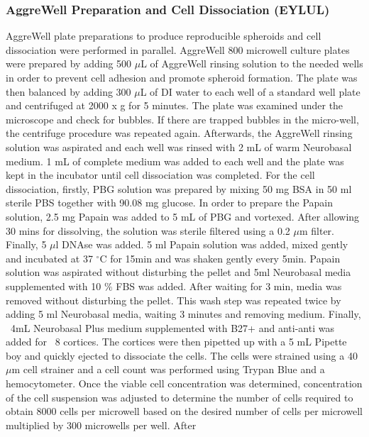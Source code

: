 \subsubsection{AggreWell\textsuperscript{\texttrademark} Preparation and Cell Dissociation (EYLUL)}
AggreWell\textsuperscript{\texttrademark} plate preparations to produce
reproducible spheroids and cell dissociation were performed in parallel.
AggreWell\textsuperscript{\texttrademark} 800 microwell culture plates were
prepared by adding 500 $\mu$L of AggreWell\textsuperscript{\texttrademark}
rinsing solution to the needed wells in order to prevent cell adhesion and
promote spheroid formation. The plate was then balanced by adding 300 $\mu$L of
DI water to each well of a standard well plate and centrifuged at 2000 x g for 5
minutes. The plate was examined under the microscope and check for bubbles. If
there are trapped bubbles in the micro-well, the centrifuge procedure was
repeated again. Afterwards, the AggreWell\textsuperscript{\texttrademark}
rinsing solution was aspirated and each well was rinsed with 2 mL of warm
Neurobasal medium. 1 mL of complete medium was added to each well and the plate
was kept in the incubator until cell dissociation was completed. For the cell
dissociation, firstly, PBG solution was prepared by mixing 50 mg BSA in 50 ml
sterile PBS together with 90.08 mg glucose. In order to prepare the Papain
solution, 2.5 mg Papain was added to 5 mL of PBG and vortexed. After allowing 30
mins for dissolving, the solution was sterile filtered using a 0.2 $\mu$m
filter. Finally, 5 $\mu$l DNAse was added. 5 ml Papain solution was added, mixed
gently and incubated at 37 $^{\circ}$C for 15min and was shaken gently every
5min. Papain solution was aspirated without disturbing the pellet and 5ml
Neurobasal media supplemented with 10 $\%$ FBS was added. After waiting for 3
min, media was removed without disturbing the pellet. This wash step was
repeated twice by adding 5 ml Neurobasal media, waiting 3 minutes and removing
medium. Finally, ~4mL Neurobasal Plus medium supplemented with B27+ and
anti-anti was added for ~8 cortices. The cortices were then pipetted up with a 5
mL Pipette boy and quickly ejected to dissociate the cells. The cells were
strained using a 40 $\mu$m cell strainer and a cell count was performed using
Trypan Blue and a hemocytometer. Once the viable cell concentration was
determined, concentration of the cell suspension was adjusted to determine the
number of cells required to obtain 8000 cells per microwell based on the desired
number of cells per microwell multiplied by 300 microwells per well. After
